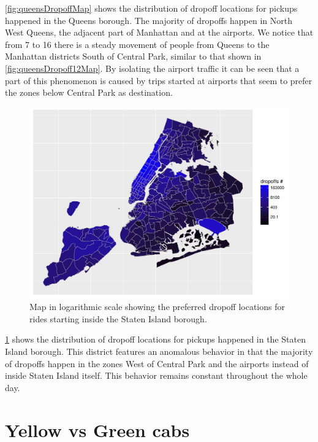 \documentclass{acm_proc_article-sp-sigmod09}
\begin{document}
\cref{fig:queensDropoffMap} shows the distribution of dropoff locations for pickups happened in the Queens borough. The majority of dropoffs happen in North West Queens, the adjacent part of Manhattan and at the airports. We notice that from 7 to 16 there is a steady movement of people from Queens to the Manhattan districts South of Central Park, similar to that shown in \cref{fig:queensDropoff12Map}. By isolating the airport traffic it can be seen that a part of this phenomenon is caused by trips started at airports that seem to prefer the zones below Central Park as destination.

\begin{figure}
	\centering
	\includegraphics[width=1\columnwidth]{resources/base_plots/staten_island_dropoff_location_id_dist_map.pdf}
	\caption{Map in logarithmic scale showing the preferred dropoff locations for rides starting inside the Staten Island borough.}
	\label{fig:statenIslandDropoffMap}
\end{figure}

\cref{fig:statenIslandDropoffMap} shows the distribution of dropoff locations for pickups happened in the Staten Island borough. This district features an anomalous behavior in that the majority of dropoffs happen in the zones West of Central Park and the airports instead of inside Staten Island itself. This behavior remains constant throughout the whole day.

\section{Yellow vs Green cabs}
\end{document}
